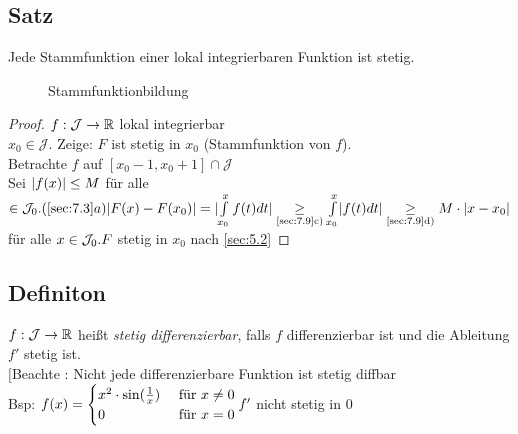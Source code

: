 \subsection[Satz:]{Satz}
Jede Stammfunktion einer lokal integrierbaren Funktion ist stetig.
\begin{figure}[h!]
\centering
{}
\caption{Stammfunktionbildung}
\end{figure}
\begin{proof}
$f: \mathcal{J} \to \mathbb{R}$ lokal integrierbar\\
$x_0 \in \mathcal{J}$. Zeige: $F$ ist stetig in $x_0$ (Stammfunktion von $f$).\\
Betrachte $f$ auf $[x_0-1,x_0+1]\cap \mathcal{J}$\\
Sei $\lvert f(x) \rvert \le M$ für alle $ \in \mathcal{J}_0. (\ref{sec:7.3}a)\\
\lvert F(x) - F(x_0) \rvert = \lvert \int\limits_{x_0}^{x} f(t)dt \rvert \underset{\text{\ref{sec:7.9}c)}}{\ge} \int\limits_{x_0}^{x} \lvert f(t)dt \rvert \underset{\text{\ref{sec:7.9}d)}}{\ge} M \cdot \lvert x-x_0 \rvert$ für alle $x\in \mathcal{J}_0.\\ F$ stetig in $x_0$ nach \ref{sec:5.2}
\end{proof}
\subsection{Definiton}
$f: \mathcal{J} \to \mathbb{R}$ hei\ss t \emph{stetig differenzierbar}, falls $f$ differenzierbar ist und die Ableitung $f'$ stetig ist.\\
$[$Beachte : Nicht jede differenzierbare Funktion ist stetig diffbar\\
Bsp: $f(x) = \begin{cases}
x^2 \cdot \sin(\frac{1}{x}) & \text{ für } x \ne 0\\
0 & \text{ für } x = 0
\end{cases}\\
f'$ nicht stetig in 0
